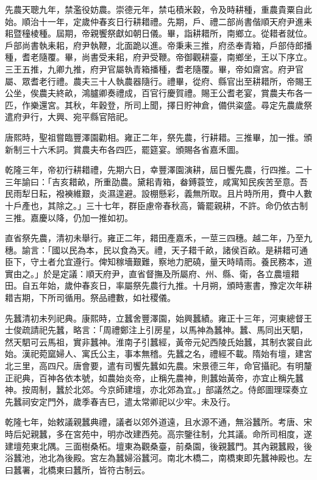 \begin{pinyinscope}
先農天聰九年，禁濫役妨農。崇德元年，禁屯積米穀，令及時耕種，重農貴粟自此始。順治十一年，定歲仲春亥日行耕耤禮。先期，戶、禮二部尚書偕順天府尹進耒耜暨穜棱種。屆期，帝親饗祭獻如朝日儀。畢，詣耕耤所，南鄉立。從耤者就位。戶部尚書執耒耜，府尹執鞭，北面跪以進。帝秉耒三推，府丞奉青箱，戶部侍郎播種，耆老隨覆。畢，尚書受耒耜，府尹受鞭。帝御觀耕臺，南鄉坐，王以下序立。三王五推，九卿九推，府尹官屬執青箱播種，耆老隨覆。畢，帝如齋宮。府尹官屬、眾耆老行禮。農夫三十人執農器隨行。禮畢，從府、縣官出至耕耤所，帝賜王公坐，俟農夫終畝，鴻臚卿奏禮成，百官行慶賀禮。賜王公耆老宴，賞農夫布各一匹，作樂還宮。其秋，年穀登，所司上聞，擇日貯神倉，備供粢盛。尋定先農歲祭遣府尹行，大興、宛平縣官陪祀。

唐熙時，聖祖嘗臨豐澤園勸相。雍正二年，祭先農，行耕耤。三推畢，加一推。頒新制三十六禾詞。賞農夫布各四匹，罷筵宴。頒賜各省嘉禾圖。

乾隆三年，帝初行耕耤禮，先期六日，幸豐澤園演耕，屆日饗先農，行四推。二十三年諭曰：「吉亥耤畝，所重劭農。黛耜青箱，畚鎛蓑笠，咸寓知民疾苦至意。吾民雨犁日耘，襏襫維艱，炎濕遑避。設棚懸彩，義無所取。且片時所用，費中人數十戶產也，其除之。」三十七年，群臣慮帝春秋高，籥罷親耕，不許。命仍依古制三推。嘉慶以降，仍加一推如初。

直省祭先農，清初未舉行。雍正二年，耤田產嘉禾，一莖三四穗。越二年，乃至九穗。諭言：「國以民為本，民以食為天。禮，天子耤千畝，諸侯百畝。是耕耤可通臣下，守土者允宜遵行。俾知稼墻艱難，察地力肥磽，量天時晴雨。養民務本，道實由之。」於是定議：順天府尹，直省督撫及所屬府、州、縣、衛，各立農壇耤田。自五年始，歲仲春亥日，率屬祭先農行九推。十月朔，頒時憲書，豫定次年耕耤吉期，下所司循用。祭品禮數，如社稷儀。

先蠶清初未列祀典。康熙時，立蠶舍豐澤園，始興蠶績。雍正十三年，河東總督王士俊疏請祀先蠶，略言：「周禮鄭注上引房星，以馬神為蠶神。蠶、馬同出天駟，然天駟可云馬祖，實非蠶神。淮南子引蠶經，黃帝元妃西陵氏始蠶，其制衣裳自此始。漢祀菀窳婦人、寓氏公主，事本無稽。先蠶之名，禮經不載。隋始有壇，建宮北三里，高四尺。唐會要，遣有司饗先蠶如先農。宋景德三年，命官攝祀。有明釐正祀典，百神各依本號，如農始炎帝，止稱先農神，則蠶始黃帝，亦宜止稱先蠶神。按周制，蠶於北郊。今京師建壇，亦北郊為宜。」部議然之。侍郎圖理琛奏立先蠶祠安定門外，歲季春吉巳，遣太常卿祀以少牢。未及行。

乾隆七年，始敕議親蠶典禮，議者以郊外道遠，且水源不通，無浴蠶所。考唐、宋時后妃親蠶，多在宮苑中，明亦改建西苑。高宗鑒往制，允其議。命所司相度，遂建壇苑東北隅。三面樹桑柘。壇東為觀桑臺，前桑園，後親蠶門。其內親蠶殿，後浴蠶池，池北為後殿。宮左為蠶婦浴蠶河。南北木橋二，南橋東即先蠶神殿也。左曰蠶署，北橋東曰蠶所，皆符古制云。


\end{pinyinscope}
